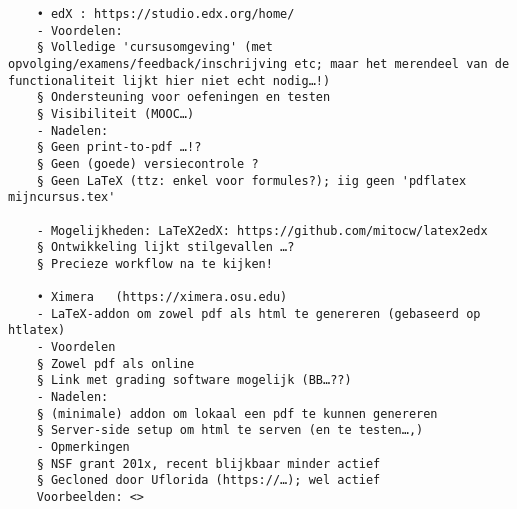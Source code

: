 \documentclass{ximera}
\begin{document}
    \newpage
    \begin{verbatim}
    • edX : https://studio.edx.org/home/
    - Voordelen:
    § Volledige 'cursusomgeving' (met opvolging/examens/feedback/inschrijving etc; maar het merendeel van de functionaliteit lijkt hier niet echt nodig…!)
    § Ondersteuning voor oefeningen en testen
    § Visibiliteit (MOOC…)
    - Nadelen:
    § Geen print-to-pdf …!?
    § Geen (goede) versiecontrole ?
    § Geen LaTeX (ttz: enkel voor formules?); iig geen 'pdflatex mijncursus.tex'
    
    - Mogelijkheden: LaTeX2edX: https://github.com/mitocw/latex2edx
    § Ontwikkeling lijkt stilgevallen …?
    § Precieze workflow na te kijken!
    
    • Ximera   (https://ximera.osu.edu)
    - LaTeX-addon om zowel pdf als html te genereren (gebaseerd op htlatex)
    - Voordelen
    § Zowel pdf als online
    § Link met grading software mogelijk (BB…??)
    - Nadelen:
    § (minimale) addon om lokaal een pdf te kunnen genereren
    § Server-side setup om html te serven (en te testen…,)
    - Opmerkingen
    § NSF grant 201x, recent blijkbaar minder actief
    § Gecloned door Uflorida (https://…); wel actief
    Voorbeelden: <>
\end{verbatim}
\end{document}
